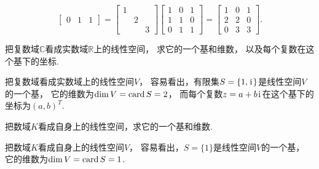 \begin{example}
\begin{solution}
\[\begin{bmatrix}
		0 & 1 & 1
	\end{bmatrix}
	= \begin{bmatrix}
		1 \\
		& 2 \\
		&& 3
	\end{bmatrix} \begin{bmatrix}
		1 & 0 & 1 \\
		1 & 1 & 0 \\
		0 & 1 & 1
	\end{bmatrix}
	= \begin{bmatrix}
		1 & 0 & 1 \\
		2 & 2 & 0 \\
		0 & 3 & 3
	\end{bmatrix}.
\]
\end{solution}
\end{example}

\begin{example}
把复数域\(\mathbb{C}\)看成实数域\(\mathbb{R}\)上的线性空间，
求它的一个基和维数，
以及每个复数在这个基下的坐标.
\begin{solution}
把复数域看成实数域上的线性空间\(V\)，
容易看出，有限集\(S = \{1,\kern1pt\mathrm{i}\kern1pt\}\)是线性空间\(V\)的一个基，
它的维数为\(\dim V = \operatorname{card} S = 2\)，
而每个复数\(z = a + b\kern1pt\mathrm{i}\kern1pt\)在这个基下的坐标为\((a,b)^T\).
\end{solution}
\end{example}

\begin{example}
把数域\(K\)看成自身上的线性空间，求它的一个基和维数.
\begin{solution}
把数域\(K\)看成自身上的线性空间\(V\)，
容易看出，\(S = \{1\}\)是线性空间\(V\)的一个基，
它的维数为\(\dim V = \operatorname{card} S = 1\).
\end{solution}
\end{example}
